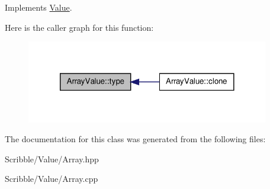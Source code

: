 Implements \hyperlink{class_value_a46b25d5bbded88a18de463f5a90d25c7}{Value}.



Here is the caller graph for this function\-:
\nopagebreak
\begin{figure}[H]
\begin{center}
\leavevmode
\includegraphics[width=300pt]{class_array_value_ab86ed64f423f11cf84e4cce177dca8bf_icgraph}
\end{center}
\end{figure}




The documentation for this class was generated from the following files\-:\begin{DoxyCompactItemize}
\item 
Scribble/\-Value/Array.\-hpp\item 
Scribble/\-Value/Array.\-cpp\end{DoxyCompactItemize}
